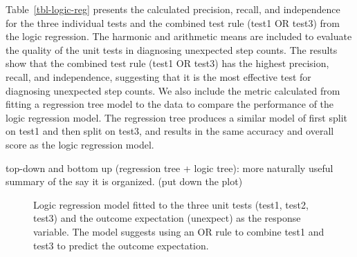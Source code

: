 \documentclass[
]{jds}
\begin{document}
Table~\ref{tbl-logic-reg} presents the calculated precision, recall, and
independence for the three individual tests and the combined test rule
(test1 OR test3) from the logic regression. The harmonic and arithmetic
means are included to evaluate the quality of the unit tests in
diagnosing unexpected step counts. The results show that the combined
test rule (test1 OR test3) has the highest precision, recall, and
independence, suggesting that it is the most effective test for
diagnosing unexpected step counts. We also include the metric calculated
from fitting a regression tree model to the data to compare the
performance of the logic regression model. The regression tree produces
a similar model of first split on test1 and then split on test3, and
results in the same accuracy and overall score as the logic regression
model.

top-down and bottom up (regression tree + logic tree): more naturally
useful summary of the say it is organized. (put down the plot)

\label{cell-fig-logic-reg}
\begin{figure}[H]


\caption{\label{fig-logic-reg}Logic regression model fitted to the three
unit tests (test1, test2, test3) and the outcome expectation (unexpect)
as the response variable. The model suggests using an OR rule to combine
test1 and test3 to predict the outcome expectation.}

\end{figure}%
\end{document}
